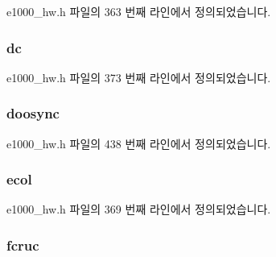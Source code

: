 e1000\+\_\+hw.\+h 파일의 363 번째 라인에서 정의되었습니다.

\subsubsection[{\texorpdfstring{dc}{dc}}]{ dc}\hypertarget{structe1000__hw__stats_aabffcd10cc28d6a940a4cec903684bd4}{}\label{structe1000__hw__stats_aabffcd10cc28d6a940a4cec903684bd4}


e1000\+\_\+hw.\+h 파일의 373 번째 라인에서 정의되었습니다.

\subsubsection[{\texorpdfstring{doosync}{doosync}}]{ doosync}\hypertarget{structe1000__hw__stats_a0eac8ccea27d94b4c5673fc7a39a9523}{}\label{structe1000__hw__stats_a0eac8ccea27d94b4c5673fc7a39a9523}


e1000\+\_\+hw.\+h 파일의 438 번째 라인에서 정의되었습니다.

\subsubsection[{\texorpdfstring{ecol}{ecol}}]{ ecol}\hypertarget{structe1000__hw__stats_af90aeb2f5595acfee451da9ed1471201}{}\label{structe1000__hw__stats_af90aeb2f5595acfee451da9ed1471201}


e1000\+\_\+hw.\+h 파일의 369 번째 라인에서 정의되었습니다.

\subsubsection[{\texorpdfstring{fcruc}{fcruc}}]{ fcruc}\hypertarget{structe1000__hw__stats_a20bb386ef5857330e14c15f4424fa09a}{}\label{structe1000__hw__stats_a20bb386ef5857330e14c15f4424fa09a}


